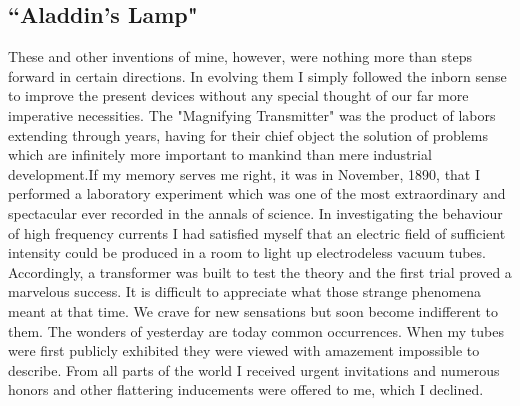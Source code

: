 \documentclass[a4paper,12pt,english,twoside,openright]{memoir}
\begin{document}
\begin{figure}[p]
\begin{center}
	\end{center}
\end{figure}

\subsection{``Aladdin's Lamp"}
These and other inventions of mine, however, were nothing more than steps forward in certain 
directions.  In evolving them I simply followed the inborn sense to improve the present devices 
without any special thought of our far more imperative necessities.  The "Magnifying Transmitter" 
was the product of labors extending through years, having for their chief object the solution of 
problems which are infinitely more important to mankind than mere industrial development.If my memory serves me right, it was in November, 1890, that I performed a laboratory 
experiment which was one of the most extraordinary and spectacular ever recorded in the annals 
of science.  In investigating the behaviour of high frequency currents I had satisfied myself that an 
electric field of sufficient intensity could be produced in a room to light up electrodeless vacuum 
tubes.  Accordingly, a transformer was built to test the theory and the first trial proved a 
marvelous success.  It is difficult to appreciate what those strange phenomena meant at that time.  
We crave for new sensations but soon become indifferent to them.  The wonders of yesterday are 
today common occurrences.  When my tubes were first publicly exhibited they were viewed with 
amazement impossible to describe.  From all parts of the world I received urgent invitations and 
numerous honors and other flattering inducements were offered to me, which I declined.  
\end{document}
